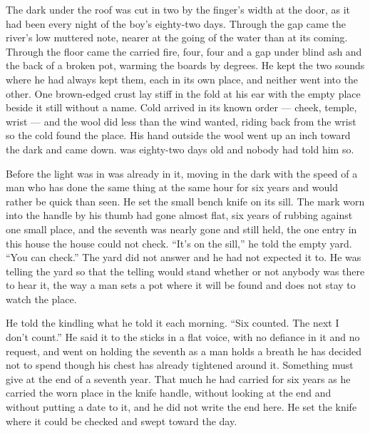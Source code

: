 
The dark under the  roof was cut in two by the finger's width at the door, as it had been every night of the boy's eighty-two days. Through the gap came the river's low muttered note, nearer at the going of the water than at its coming. Through the floor came the carried fire, four, four and a gap under blind ash and the back of a broken pot, warming the boards by degrees. He kept the two sounds where he had always kept them, each in its own place, and neither went into the other. One brown-edged crust lay stiff in the fold at his ear with the empty place beside it still without a name. Cold arrived in its known order --- cheek, temple, wrist --- and the wool did less than the wind wanted, riding back from the wrist so the cold found the place. His hand outside the wool went up an inch toward the dark and came down.  was eighty-two days old and nobody had told him so.

Before the light was in   was already in it, moving in the dark with the speed of a man who has done the same thing at the same hour for six years and would rather be quick than seen. He set the small bench knife on its sill. The mark worn into the handle by his thumb had gone almost flat, six years of rubbing against one small place, and the seventh was nearly gone and still held, the one entry in this house the house could not check. “It's on the sill,” he told the empty yard. “You can check.” The yard did not answer and he had not expected it to. He was telling the yard so that the telling would stand whether or not anybody was there to hear it, the way a man sets a pot where it will be found and does not stay to watch the place.

He told the kindling what he told it each morning. “Six counted. The next I don't count.” He said it to the sticks in a flat voice, with no defiance in it and no request, and went on holding the seventh as a man holds a breath he has decided not to spend though his chest has already tightened around it. Something must give at the end of a seventh year. That much he had carried for six years as he carried the worn place in the knife handle, without looking at the end and without putting a date to it, and he did not write the end here. He set the knife where it could be checked and swept toward the day.

\scenebreak

